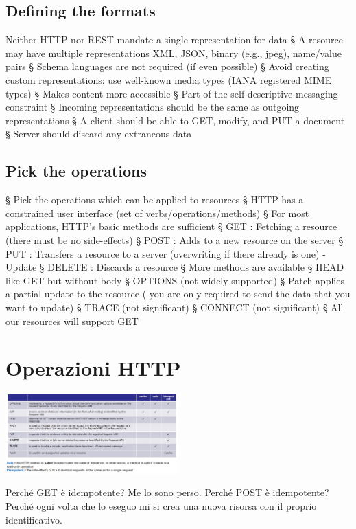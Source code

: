 \subsection{Defining the formats}
Neither HTTP nor REST mandate a single representation for data
§ A resource may have multiple representations
XML, JSON, binary (e.g., jpeg), name/value pairs
§ Schema languages are not required (if even possible)
§ Avoid creating custom representations: use well-known media types (IANA registered MIME types)
§ Makes content more accessible
§ Part of the self-descriptive messaging constraint
§ Incoming representations should be the same as outgoing representations
§ A client should be able to GET, modify, and PUT a document
§ Server should discard any extraneous data

\subsection{Pick the operations}
§ Pick the operations which can be applied to resources
§ HTTP has a constrained user interface (set of verbs/operations/methods)
§ For most applications, HTTP's basic methods are sufficient
§ GET : Fetching a resource (there must be no side-effects)
§ POST : Adds to a new resource on the server
§ PUT : Transfers a resource to a server (overwriting if there already is one) - Update
§ DELETE : Discards a resource
§ More methods are available
§ HEAD like GET but without body
§ OPTIONS (not widely supported)
§ Patch applies a partial update to the resource ( you are only required to send the data that you want to update)
§ TRACE (not significant)
§ CONNECT (not significant)
§ All our resources will support GET

\section{Operazioni HTTP}
\begin{center}
    \includegraphics[width=0.5\textwidth]{img/REST4.jpg}
\end{center}
Perché GET è idempotente? Me lo sono perso.
Perché POST è idempotente? Perché ogni volta che lo eseguo mi si crea una nuova risorsa con il proprio identificativo.

